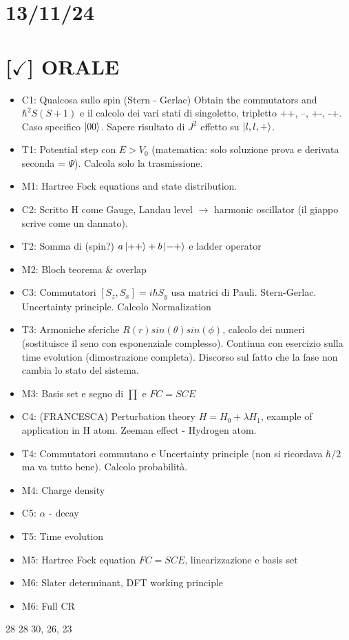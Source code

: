 \section{13/11/24}

\section{[$\checkmark$] ORALE}

\begin{itemize}
    \item C1: Qualcosa sullo spin (Stern - Gerlac) Obtain the commutators and $\hbar^2 S(S+1)$ e il calcolo dei vari stati di singoletto, tripletto ++, --, +-, -+. Caso specifico $\ket{00}$. Sapere risultato di $J^2$ effetto su $\ket{l,l,+}$.  
    \item T1: Potential step con $E > V_0$ (matematica: solo soluzione prova e derivata seconda = $\Psi$). Calcola solo la trasmissione. 
    \item M1: Hartree Fock equations and state distribution. 
    \item C2: Scritto H come Gauge, Landau level $\rightarrow$ harmonic oscillator (il giappo scrive come un dannato).
    \item T2: Somma di (spin?) $a\ket{++} + b\ket{-+}$ e ladder operator
    \item M2: Bloch teorema \& overlap
    \item C3: Commutatori $[S_z, S_x] = i\hbar S_y$ usa matrici di Pauli. Stern-Gerlac. Uncertainty principle. Calcolo Normalization
    \item T3: Armoniche sferiche $R(r)sin(\theta) sin(\phi)$, calcolo dei numeri (sostituisce il seno con esponenziale complesso). Continua con esercizio sulla time evolution (dimostrazione completa). Discorso sul fatto che la fase non cambia lo stato del sistema.
    \item M3: Basis set e segno di $\prod$ e $FC = SCE$
    \item C4: (FRANCESCA) Perturbation theory $H = H_0 + \lambda H_1$, example of application in H atom. Zeeman effect - Hydrogen atom.
    \item T4: Commutatori commutano e Uncertainty principle (non si ricordava $\hbar / 2$ ma va tutto bene). Calcolo probabilità.
    \item M4: Charge density
    \item C5: $\alpha$ - decay
    \item T5: Time evolution
    \item M5: Hartree Fock equation $FC = SCE$, linearizzazione e basis set
    \item M6: Slater determinant, DFT working principle 
    \item M6: Full CR
\end{itemize}

28 28 30, 26, 23